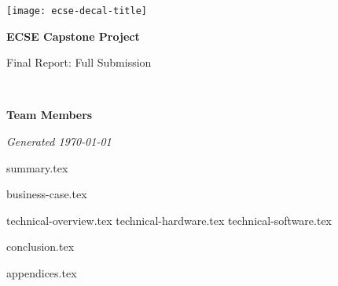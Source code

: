 \documentclass{capstone}
\begin{document}

\titlepage
	{\texttt{[image: ecse-decal-title]}}
	{
		\centering\sffamily
		{\Huge\bfseries ECSE Capstone Project\par}
		\vspace{16pt} 
		{\LARGE Final Report: Full Submission\par} 
		\vspace{24pt}
		{\huge\bfseries \teamname\par} %
	}


~\vfill

\noindent \textbf{Team Members}
\teammembers

\noindent \textit{Generated \today}

\tableofcontents

\cleardoublepage
{summary.tex}

{business-case.tex}

{technical-overview.tex}
{technical-hardware.tex}
{technical-software.tex}

{conclusion.tex}

\begin{appendices}
{appendices.tex}
\end{appendices}
\end{document}
